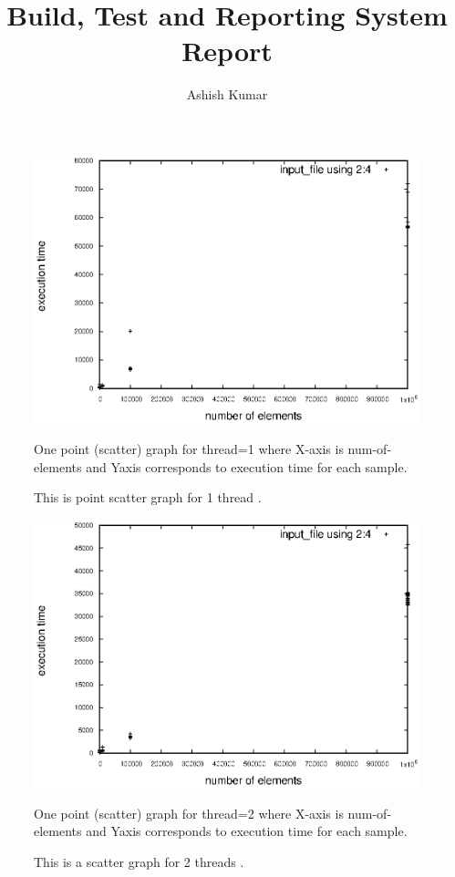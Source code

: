 \documentclass{article}
\title{Build, Test and Reporting System Report}
\author{Ashish Kumar}
\date{}
\begin{document}
\maketitle

\begin{figure}
\centering
\includegraphics{graphs/1_t1.eps}
 \vspace{60pt}
 \caption{This is point scatter graph for 1 thread .}
 \vspace{30pt}
 One point (scatter) graph for thread=1 where X-axis is num-of-elements and Yaxis
 corresponds to execution time for each sample.
 \label{fig:1_t1}
\end{figure}


\begin{figure}
\centering
\includegraphics{graphs/2_t1.eps}
 \vspace{60pt}
 \caption{This is a scatter graph for 2 threads .}
 \vspace{30pt}
 One point (scatter) graph for thread=2 where X-axis is num-of-elements and Yaxis
 corresponds to execution time for each sample.
 \label{fig:2_t1}
\end{figure}
\end{document}
